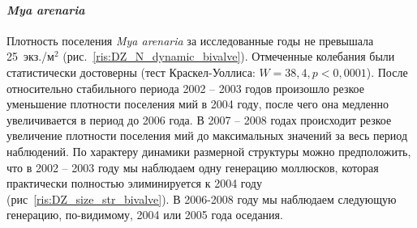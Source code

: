 \paragraph{\textit{Mya arenaria}}
Плотность поселения {\it Mya arenaria} за исследованные годы не превышала 25~экз./м$^2$ (рис.~\ref{ris:DZ_N_dynamic_bivalve}). 
Отмеченные колебания были статистически достоверны (тест Краскел-Уоллиса: $W=38,4, p<0,0001$).  
После относительно стабильного периода 2002 -- 2003 годов произошло резкое уменьшение плотности поселения мий в 2004 году, после чего она медленно увеличивается в период до 2006 года. 
В 2007 -- 2008 годах происходит резкое увеличение плотности поселения мий до максимальных значений за весь период наблюдений.
По характеру динамики размерной структуры можно предположить, что в 2002 -- 2003 году мы наблюдаем одну генерацию моллюсков, которая практически полностью элиминируется к 2004 году (рис~\ref{ris:DZ_size_str_bivalve}). 
В 2006-2008 году мы наблюдаем следующую генерацию, по-видимому, 2004 или 2005 года оседания.

\afterpage{\clearpage}
